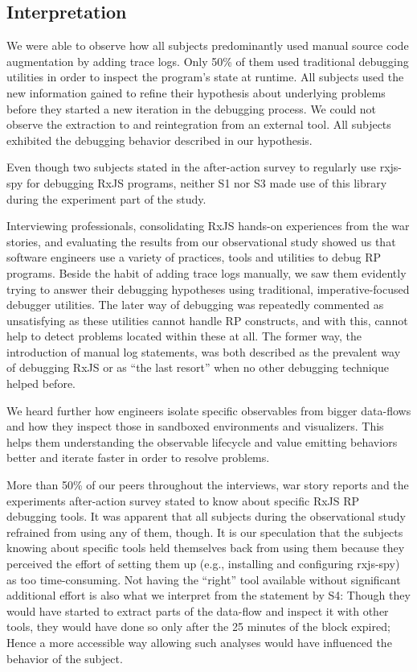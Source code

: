 \documentclass[sigplan,screen,review]{acmart}
\begin{document}
\subsection{Interpretation}

We were able to observe how all subjects predominantly used manual source code augmentation by adding trace logs. Only 50\% of them used traditional debugging utilities in order to inspect the program's state at runtime. All subjects used the new information gained to refine their hypothesis about underlying problems before they started a new iteration in the debugging process. We could not observe the extraction to and reintegration from an external tool. All subjects exhibited the debugging behavior described in our hypothesis.

Even though two subjects stated in the after-action survey to regularly use rxjs-spy for debugging RxJS programs, neither S1 nor S3 made use of this library during the experiment part of the study.

Interviewing professionals, consolidating RxJS hands-on experiences from the war stories, and evaluating the results from our observational study showed us that software engineers use a variety of practices, tools and utilities to debug RP programs. Beside the habit of adding trace logs manually, we saw them evidently trying to answer their debugging hypotheses using traditional, imperative-focused debugger utilities. The later way of debugging was repeatedly commented as unsatisfying as these utilities cannot handle RP constructs, and with this, cannot help to detect problems located within these at all. The former way, the introduction of manual log statements, was both described as the prevalent way of debugging RxJS or as ``the last resort'' when no other debugging technique helped before.

We heard further how engineers isolate specific observables from bigger data-flows and how they inspect those in sandboxed environments and visualizers. This helps them understanding the observable lifecycle and value emitting behaviors better and iterate faster in order to resolve problems.

More than 50\% of our peers throughout the interviews, war story reports and the experiments after-action survey stated to know about specific RxJS RP debugging tools. It was apparent that all subjects during the observational study refrained from using any of them, though. It is our speculation that the subjects knowing about specific tools held themselves back from using them because they perceived the effort of setting them up (e.g., installing and configuring rxjs-spy) as too time-consuming. Not having the ``right'' tool available without significant additional effort is also what we interpret from the statement by S4: Though they would have started to extract parts of the data-flow and inspect it with other tools, they would have done so only after the 25 minutes of the block expired; Hence a more accessible way allowing such analyses would have influenced the behavior of the subject.
\end{document}
